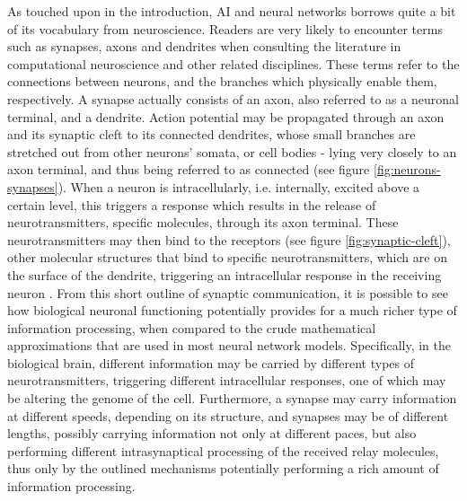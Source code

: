 As touched upon in the introduction, AI and neural networks borrows quite a bit of its vocabulary from neuroscience. Readers are very likely to encounter terms such as synapses, axons and dendrites when consulting the literature in computational neuroscience and other related disciplines. These terms refer to the connections between neurons, and the branches which physically enable them, respectively. A synapse actually consists of an axon, also referred to as a neuronal terminal, and a dendrite. Action potential may be propagated through an axon and its synaptic cleft to its connected dendrites, whose small branches are stretched out from other neurons' somata, or cell bodies - lying very closely to an axon terminal, and thus being referred to as connected (see figure \ref{fig:neurons-synapses}). When a neuron is intracellularly, i.e. internally, excited above a certain level, this triggers a response which results in the release of neurotransmitters, specific molecules, through its axon terminal. These neurotransmitters may then bind to the receptors (see figure \ref{fig:synaptic-cleft}), other molecular structures that bind to specific neurotransmitters, which are on the surface of the dendrite, triggering an intracellular response in the receiving neuron \citep{Campbell2015chpt9}. From this short outline of synaptic communication, it is possible to see how biological neuronal functioning potentially provides for a much richer type of information processing, when compared to the crude mathematical approximations that are used in most neural network models. Specifically, in the biological brain, different information may be carried by different types of neurotransmitters, triggering different intracellular responses, one of which may be altering the genome of the cell. Furthermore, a synapse may carry information at different speeds, depending on its structure, and synapses may be of different lengths, possibly carrying information not only at different paces, but also performing different intrasynaptical processing of the received relay molecules, thus only by the outlined mechanisms potentially performing a rich amount of information processing.

